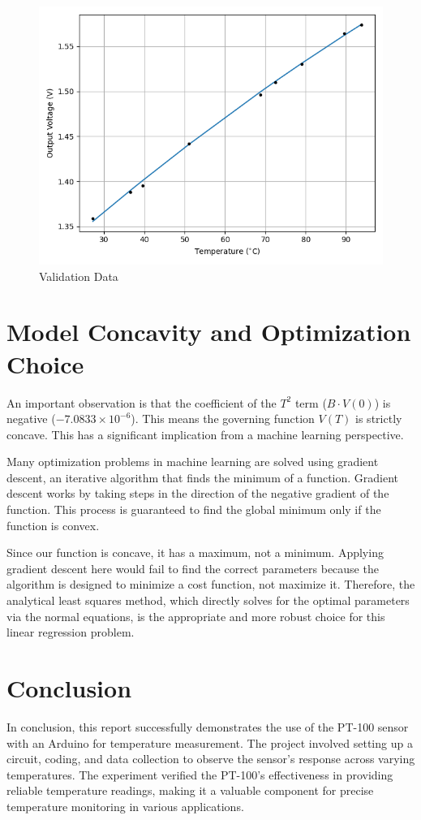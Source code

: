 \documentclass{article}
\begin{document}
\begin{figure}[H]
	\centering
	\includegraphics[width=1\linewidth]{../figs/valid}
	\caption{Validation Data}
	\label{fig:valid}
\end{figure}

	
	\section{Model Concavity and Optimization Choice}
	An important observation is that the coefficient of the \(T^2\) term (\(B \cdot V(0)\)) is negative ($-7.0833 \times 10^{-6}$). This means the governing function \(V(T)\) is strictly concave. This has a significant implication from a machine learning perspective.
	
	Many optimization problems in machine learning are solved using gradient descent, an iterative algorithm that finds the minimum of a function. Gradient descent works by taking steps in the direction of the negative gradient of the function. This process is guaranteed to find the global minimum only if the function is convex.
	
	Since our function is concave, it has a maximum, not a minimum. Applying gradient descent here would fail to find the correct parameters because the algorithm is designed to minimize a cost function, not maximize it. Therefore, the analytical least squares method, which directly solves for the optimal parameters via the normal equations, is the appropriate and more robust choice for this linear regression problem.
	
	\section{Conclusion}
	In conclusion, this report successfully demonstrates the use of the PT-100 sensor with an Arduino for temperature measurement. The project involved setting up a circuit, coding, and data collection to observe the sensor's response across varying temperatures. The experiment verified the PT-100's effectiveness in providing reliable temperature readings, making it a valuable component for precise temperature monitoring in various applications.
	
\end{document}
